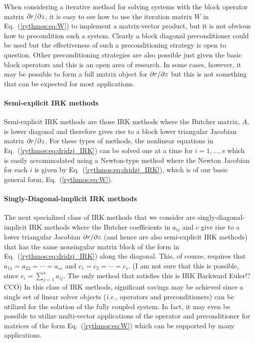 When considering a iterative method for solving systems with the block
operator matrix $\partial r / \partial z$, it is easy to see how to use the iteration
matrix $W$ in Eq.~(\ref{rythmos:eq:W}) to implement a matrix-vector
product, but it is not obvious how to precondition such a system.
Clearly a block diagonal preconditioner could be used but the effectiveness
of such a preconditioning strategy is open to question. Other preconditioning
strategies are also possible just given the basic block operators
and this is an open area of research. In some cases, however, it may
be possible to form a full matrix object for $\partial r / \partial z$ but this
is not something that can be expected for most applications.

\paragraph{Semi-explicit IRK methods}

Semi-explicit IRK methods are those IRK methods where the Butcher
matrix, $A$, is lower diagonal and therefore gives rise to a block
lower triangular Jacobian matrix $\partial r / \partial z$. For these types of
methods, the nonlinear equations in Eq.~(\ref{rythmos:eq:dridzj_IRK})
can be solved one at a time for $i=1,\ldots,s$ which is easily accommodated
using a Newton-type method where the Newton Jacobian for each $i$
is given by Eq.~(\ref{rythmos:eq:dridzj_IRK}), which is of our basic
general form, Eq.~(\ref{rythmos:eq:W}).

\paragraph{Singly-Diagonal-implicit IRK methods}

The next specialized class of IRK methods that we consider are singly-diagonal-implicit
IRK methods where the Butcher coefficients in $a_{ij}$ and $c$ give
rise to a lower triangular Jacobian $\partial r / \partial z$ (and hence are also
semi-explicit IRK methods) that has the same nonsingular matrix block
of the form in Eq.~(\ref{rythmos:eq:dridzj_IRK}) along the diagonal.
This, of course, requires that $a_{11}=a_{22}=\cdots=a_{ss}$ and
$c_{1}=c_{2}=\cdots=c_{s}$. (I am not sure that this is possible,
since $c_{i}=\sum_{j=1}^{s}a_{ij}$. The only method that satisfies
this is IRK Backward Euler!? CCO) In this class of IRK methods, significant
savings may be achieved since a single set of linear solver objects
(\emph{i.e.}, operators and preconditioners) can be utilized for the
solution of the fully coupled system. In fact, it may even be possible
to utilize multi-vector applications of the operator and preconditioner
for matrices of the form Eq.~(\ref{rythmos:eq:W}) which can be supported
by many applications. 

